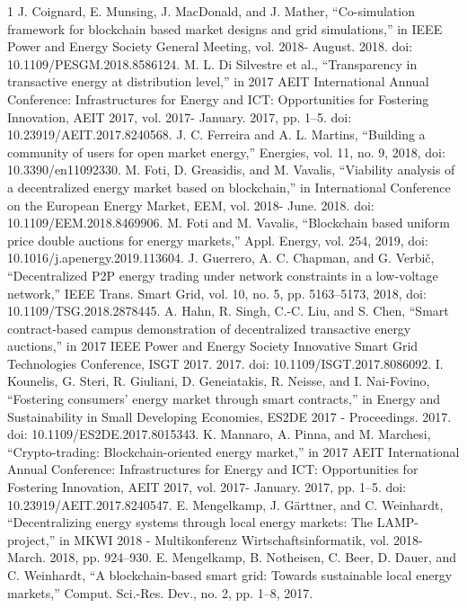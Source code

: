 \documentclass[lettersize,journal]{IEEEtran}
\begin{document}
\begin{thebibliography}{1}
\bibitem{}J. Coignard, E. Munsing, J. MacDonald, and J. Mather, “Co-simulation framework for blockchain based market designs and grid simulations,” in IEEE Power and Energy Society General Meeting, vol. 2018- August. 2018. doi: 10.1109/PESGM.2018.8586124.
\bibitem{}M. L. Di Silvestre et al., “Transparency in transactive energy at distribution level,” in 2017 AEIT International Annual Conference: Infrastructures for Energy and ICT: Opportunities for Fostering Innovation, AEIT 2017, vol. 2017- January. 2017, pp. 1–5. doi: 10.23919/AEIT.2017.8240568.
\bibitem{}J. C. Ferreira and A. L. Martins, “Building a community of users for open market energy,” Energies, vol. 11, no. 9, 2018, doi: 10.3390/en11092330.
\bibitem{}M. Foti, D. Greasidis, and M. Vavalis, “Viability analysis of a decentralized energy market based on blockchain,” in International Conference on the European Energy Market, EEM, vol. 2018- June. 2018. doi: 10.1109/EEM.2018.8469906.
\bibitem{}M. Foti and M. Vavalis, “Blockchain based uniform price double auctions for energy markets,” Appl. Energy, vol. 254, 2019, doi: 10.1016/j.apenergy.2019.113604.
\bibitem{}J. Guerrero, A. C. Chapman, and G. Verbič, “Decentralized P2P energy trading under network constraints in a low-voltage network,” IEEE Trans. Smart Grid, vol. 10, no. 5, pp. 5163–5173, 2018, doi: 10.1109/TSG.2018.2878445.
\bibitem{}A. Hahn, R. Singh, C.-C. Liu, and S. Chen, “Smart contract-based campus demonstration of decentralized transactive energy auctions,” in 2017 IEEE Power and Energy Society Innovative Smart Grid Technologies Conference, ISGT 2017. 2017. doi: 10.1109/ISGT.2017.8086092.
\bibitem{}I. Kounelis, G. Steri, R. Giuliani, D. Geneiatakis, R. Neisse, and I. Nai-Fovino, “Fostering consumers’ energy market through smart contracts,” in Energy and Sustainability in Small Developing Economies, ES2DE 2017 - Proceedings. 2017. doi: 10.1109/ES2DE.2017.8015343.
\bibitem{}K. Mannaro, A. Pinna, and M. Marchesi, “Crypto-trading: Blockchain-oriented energy market,” in 2017 AEIT International Annual Conference: Infrastructures for Energy and ICT: Opportunities for Fostering Innovation, AEIT 2017, vol. 2017- January. 2017, pp. 1–5. doi: 10.23919/AEIT.2017.8240547.
\bibitem{}E. Mengelkamp, J. Gärttner, and C. Weinhardt, “Decentralizing energy systems through local energy markets: The LAMP-project,” in MKWI 2018 - Multikonferenz Wirtschaftsinformatik, vol. 2018- March. 2018, pp. 924–930.
\bibitem{}E. Mengelkamp, B. Notheisen, C. Beer, D. Dauer, and C. Weinhardt, “A blockchain-based smart grid: Towards sustainable local energy markets,” Comput. Sci.-Res. Dev., no. 2, pp. 1–8, 2017.

\end{thebibliography}
\end{document}
